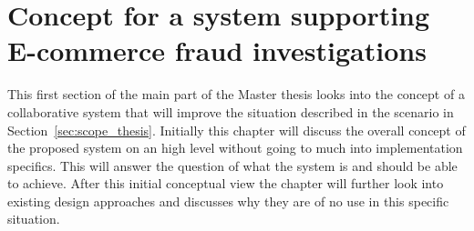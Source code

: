 
\chapter{Concept for a system supporting \gls{E-commerce} fraud investigations} %
\label{cha:system_concept}

This first section of the main part of the Master thesis looks into the concept  of a collaborative system that will improve the situation described in the scenario in Section~\ref{sec:scope_thesis}. Initially this chapter will discuss the overall concept of the proposed system on an high level without going to much into implementation specifics. This will answer the question of what the system is and should be able to achieve. After this initial conceptual view the chapter will further look into existing design approaches and discusses why they are of no use in this specific situation.








